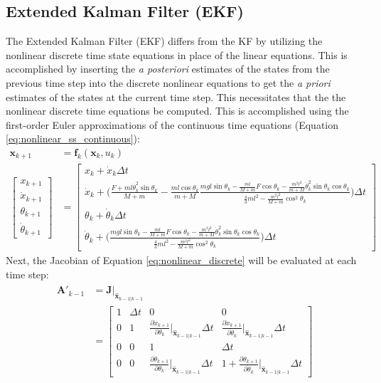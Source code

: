 \documentclass{article}
\newcommand{\matr}[1]{\bm{#1}}     %
\begin{document}
\subsection{Extended Kalman Filter (EKF)}
The Extended Kalman Filter (EKF) differs from the KF by utilizing the nonlinear discrete time state equations in place of the linear equations. This is accomplished by inserting the \textit{a posteriori} estimates of the states from the previous time step into the discrete nonlinear equations to get the \textit{a priori} estimates of the states at the current time step. This necessitates that the the nonlinear discrete time equations be computed. This is accomplished using the first-order Euler approximations of the continuous time equations (Equation \ref{eq:nonlinear_ss_continuous}):
\begin{equation}
\begin{aligned}
\matr{x}_{k+1} &= \matr{f}_k (\matr{x}_k,u_k) \\
\begin{bmatrix}
x_{k+1} \\[8pt]
\dot{x}_{k+1} \\[8pt]
\theta_{k+1} \\[8pt]
\dot{\theta}_{k+1}
\end{bmatrix} &= \begin{bmatrix}
x_k + \dot{x}_k \Delta t \\
\dot{x}_k + \biggr(\frac{F+ml\dot{\theta}_k^2\sin\theta_k}{M+m} -\frac{ml\cos\theta_k}{m+M}\frac{mgl\sin\theta_k- \frac{ml}{M+m} F\cos\theta_k -\frac{m^2l^2}{m+M}\dot{\theta}_k^2\sin\theta_k\cos\theta_k}{\frac{4}{3}ml^2-\frac{m^2l^2}{M+m}\cos^2 \theta_k}\biggr) \Delta t  \\
\theta_k + \dot{\theta}_k \Delta t \\
\dot{\theta}_k + \biggr(\frac{mgl\sin\theta_k - \frac{ml}{M+m} F\cos\theta_k -\frac{m^2l^2}{m+M}\dot{\theta}_k^2\sin\theta_k\cos\theta_k}{\frac{4}{3}ml^2-\frac{m^2l^2}{M+m}\cos^2 \theta_k}\biggr) \Delta t
\end{bmatrix}
\end{aligned}
\label{eq:nonlinear_discrete}
\end{equation}
Next, the Jacobian of Equation \ref{eq:nonlinear_discrete} will be evaluated at each time step:
\begin{align}
\begin{aligned}
\matr{A'}_{k-1} &= \matr{J}\bigr|_{\hat{\matr{x}}_{k-1|k-1}} \\
&= \begin{bmatrix}
1 & \Delta t & 0 & 0 \\[8pt]
0 & 1 & \frac{\partial \dot{x}_{k+1}}{\partial \theta_k}\Big|_{\hat{\matr{x}}_{k-1|k-1}}\Delta t & \frac{\partial \dot{x}_{k+1}}{\partial \dot{\theta}_k}\Big|_{\hat{\matr{x}}_{k-1|k-1}}\Delta t \\[8pt]
0 & 0 & 1 & \Delta t \\[8pt]
0 & 0 & \frac{\partial \dot{\theta}_{k+1}}{\partial \theta_k}\Big|_{\hat{\matr{x}}_{k-1|k-1}}\Delta t & 1+\frac{\partial \dot{\theta}_{k+1}}{\partial \dot{\theta}_k}\Big|_{\hat{\matr{x}}_{k-1|k-1}}\Delta t
\end{bmatrix}
\end{aligned}
\label{eq:jacobian_EKF}
\end{align}
\end{document}
